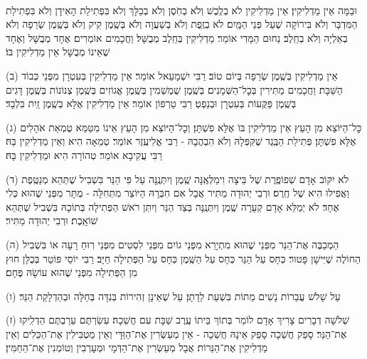 \documentclass[twoside, openany, parskip=half, 11pt]{book}
\begin{document}
\mournerskaddish


\\
וּבַמָּה אֵין מַדְלִיקִין׃ אֵין מַדְלִיקִין לֹא בְלֶֽכֶשׁ וְלֹא בְחֹֽסֶן וְלֹא בְכַלָּךְ וְלֹא בִּפְתִילַת הָאִידָן וְלֹא בִּפְתִילַת הַמִּדְבָּר וְלֹא בִּירוֹקָה שֶׁעַל פְּנֵי הַמָּֽיִם׃ לֹא בְזֶֽפֶת וְלֹא בְשַׁעֲוָה וְלֹא בְּשֶֽׁמֶן קִיק וְלֹא בְּשֶֽׁמֶן שְׂרֵפָה וְלֹא בְאַלְיָה וְלֹא בְחֵֽלֶב׃ נַחוּם הַמָּדִי אוֹמֵר׃ מַדְלִיקִין בְּחֵֽלֶב מְבֻשָּׁל׃ וַחֲכָמִים אוֹמְרִים׃ אֶחָד מְבֻשָּׁל וְאֶחָד שֶׁאֵינוֹ מְבֻשָּׁל אֵין מַדְלִיקִין בּוֹ׃

(ב) אֵין מַדְלִיקִין בְּשֶֽׁמֶן שְׂרֵפָה בְּיוֹם טוֹב׃ רַבִּי יִשְׁמָעֵאל אוֹמֵר׃ אֵין מַדְלִיקִין בְּעִטְרָן מִפְּנֵי כְּבוֹד הַשַּׁבָּת׃ וַחֲכָמִים מַתִּירִין בְּכׇל־הַשְּׁמָנִים׃ בְּשֶֽׁמֶן שֻׁמְשְׁמִין בְּשֶֽׁמֶן אֱגוֹזִים בְּשֶֽׁמֶן צְנוֹנוֹת בְּשֶֽׁמֶן דָּגִים בְּשֶֽׁמֶן פַּקֻּעוֹת בְּעִטְרָן וּבְנֵפְטְ׃ רַבִּי טַרְפוֹן אוֹמֵר׃ אֵין מַדְלִיקִין אֶלָּא בְּשֶֽׁמֶן זַֽיִת בִּלְבָד׃

(ג) כׇּל־הַיּוֹצֵא מִן הָעֵץ אֵין מַדְלִיקִין בּוֹ אֶלָּא פִשְׁתָּן׃ וְכׇל־הַיּוֹצֵא מִן הָעֵץ אֵינוֹ מִטַּמֵּא טֻמְאַת אֹהָלִים אֶלָּא פִשְׁתָּן׃ פְּתִילַת הַבֶּֽגֶד שֶׁקִּפְּלָהּ וְלֹא הִבְהֲבָהּ - רַבִּי אֱלִיעֶֽזֶר אוֹמֵר׃ טְמֵאָה הִיא וְאֵין מַדְלִיקִין בָּהּ׃ רַבִּי עֲקִיבָא אוֹמֵר׃ טְהוֹרָה הִיא וּמַדְלִיקִין בָּהּ׃

(ד) לֹא יִקּוֹב אָדָם שְׁפוֹפֶֽרֶת שֶׁל בֵּיצָה וִימַלְּאֶֽנָּה שֶֽׁמֶן וְיִתְּנֶֽנָּה עַל פִּי הַנֵּר בִּשְׁבִיל שֶׁתְּהֵא מְנַטֶּֽפֶת וַאֲפִילוּ הִיא שֶׁל חֶֽרֶס׃ וּרְבִי יְהוּדָה מַתִּיר אֲבָל אִם חִבְּרָהּ הַיּוֹצֵר מִתְּחִלָּה - מֻתָּר מִפְּנֵי שֶׁהוּא כְּלִי אֶחָד׃ לֹא יְמַלֵּא אָדָם קְעָרָה שֶֽׁמֶן וְיִתְּנֶֽנָּה בְּצַד הַנֵּר וְיִתֵּן רֹאשׁ הַפְּתִילָה בְּתוֹכָהּ בִּשְׁבִיל שֶׁתְּהֵא שׁוֹאָֽבֶת׃ וּרְבִי יְהוּדָה מַתִּיר׃

(ה) הַמְכַבֶּה אֶת־הַנֵּר מִפְּנֵי שֶׁהוּא מִתְיָרֵא מִפְּנֵי גוֹיִם מִפְּנֵי לִסְטִים מִפְּנֵי רֽוּחַ רָעָה אוֹ בִּשְׁבִיל הַחוֹלֶה שֶׁיִּישָׁן פָּטוּר׃ כְּחָס עַל הַנֵּר כְּחָס עַל הַשֶּֽׁמֶן כְּחָס עַל הַפְּתִילָה חַיָּב׃ רַבִּי יוֹסֵי פּוֹטֵר בְּכֻלָּן חוּץ מִן הַפְּתִילָה מִפְּנֵי שֶׁהוּא עוֹשָׂהּ פֶּחָם׃

(ו) עַל שָׁלֹשׁ עֲבֵרוֹת נָשִׁים מֵתוֹת בִּשְׁעַת לֵדָתָן׃ עַל שֶׁאֵינָן זְהִירוֹת בְּנִדָּה בְּחַלָּה וּבְהַדְלָקַת הַנֵּר׃

(ז) שְׁלֹשָׁה דְבָרִים צָרִיךְ אָדָם לוֹמַר בְּתוֹךְ בֵּיתוֹ עֶֽרֶב שַׁבָּת עִם חֲשֵׁכָה׃ עִשַׂרְתֶּם עֵרַבְתֶּם הַדְלִֽיקוּ אֶת־הַנֵּר׃ סָפֵק חֲשֵׁכָה סָפֵק אֵינָהּ חֲשֵׁכָה - אֵין מְעַשְּׂרִין אֶת־הַוַּדָּי וְאֵין מַטְבִּילִין אֶת־הַכֵּלִים וְאֵין מַדְלִיקִין אֶת־הַנֵּרוֹת׃ אֲבָל מְעַשְּׂרִין אֶת־הַדְּמָי וּמְעָרְבִין וְטוֹמְנִין אֶת־הַחַמִּין׃
\end{document}
